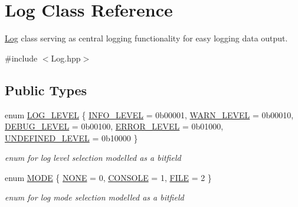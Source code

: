 \hypertarget{class_log}{}\section{Log Class Reference}
\label{class_log}


\mbox{\hyperlink{class_log}{Log}} class serving as central logging functionality for easy logging data output.  




{\ttfamily \#include $<$Log.\+hpp$>$}

\subsection*{Public Types}
\begin{DoxyCompactItemize}
\item 
enum \mbox{\hyperlink{class_log_ad671761fe5e2e030871610bd6dfecd79}{L\+O\+G\+\_\+\+L\+E\+V\+EL}} \{ \newline
\mbox{\hyperlink{class_log_ad671761fe5e2e030871610bd6dfecd79aefda05f8a0be294511d3c66b56edcf42}{I\+N\+F\+O\+\_\+\+L\+E\+V\+EL}} = 0b00001, 
\mbox{\hyperlink{class_log_ad671761fe5e2e030871610bd6dfecd79ac7b1a053f29856bf7cdf7776c0977105}{W\+A\+R\+N\+\_\+\+L\+E\+V\+EL}} = 0b00010, 
\mbox{\hyperlink{class_log_ad671761fe5e2e030871610bd6dfecd79a36d0ec637511004f425dbbd88d169d00}{D\+E\+B\+U\+G\+\_\+\+L\+E\+V\+EL}} = 0b00100, 
\mbox{\hyperlink{class_log_ad671761fe5e2e030871610bd6dfecd79aa01fc657c9d1fa221f71708efa8445d2}{E\+R\+R\+O\+R\+\_\+\+L\+E\+V\+EL}} = 0b01000, 
\newline
\mbox{\hyperlink{class_log_ad671761fe5e2e030871610bd6dfecd79a4ca59cfc20185b6e47712f5a787fdd8b}{U\+N\+D\+E\+F\+I\+N\+E\+D\+\_\+\+L\+E\+V\+EL}} = 0b10000
 \}
\begin{DoxyCompactList}\small\item\em enum for log level selection modelled as a bitfield \end{DoxyCompactList}\item 
enum \mbox{\hyperlink{class_log_a6b5eceb8cb84489c1a8fee40ac1d37dc}{M\+O\+DE}} \{ \mbox{\hyperlink{class_log_a6b5eceb8cb84489c1a8fee40ac1d37dca01bfaaeef38ef033ef28468316082661}{N\+O\+NE}} = 0, 
\mbox{\hyperlink{class_log_a6b5eceb8cb84489c1a8fee40ac1d37dcad6080f9ff3b3f48a9e533b2ed44b1c1f}{C\+O\+N\+S\+O\+LE}} = 1, 
\mbox{\hyperlink{class_log_a6b5eceb8cb84489c1a8fee40ac1d37dca21dc03633cffcefe094c557641827421}{F\+I\+LE}} = 2
 \}
\begin{DoxyCompactList}\small\item\em enum for log mode selection modelled as a bitfield \end{DoxyCompactList}\item 

\end{DoxyCompactItemize}
